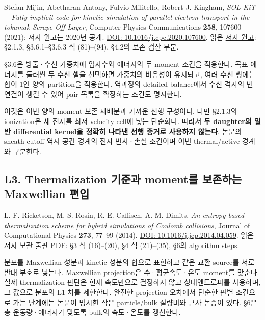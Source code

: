 Stefan Mijin, Abetharan Antony, Fulvio Militello, Robert J. Kingham, \emph{SOL-KiT---Fully implicit code for kinetic simulation of parallel electron transport in the tokamak Scrape-Off Layer}, Computer Physics Communications \textbf{258}, 107600 (2021); 저자 원고는 2020년 공개. \href{https://doi.org/10.1016/j.cpc.2020.107600}{DOI: 10.1016/j.cpc.2020.107600}. 읽은 \href{https://ar5iv.labs.arxiv.org/html/2003.00769}{저자 원고}: §2.1.3, §3.6.1--§3.6.3 식 (81)--(94), §4.2의 보존 검산 부분.

§3.6은 방출·수신 가중치에 입자수와 에너지의 두 moment 조건을 적용한다. 목표 에너지를 둘러싼 두 수신 셀을 선택하면 가중치의 비음성이 유지되고, 여러 수신 쌍에는 합이 1인 양의 partition을 적용한다. 역과정의 detailed balance에서 수신 격자의 빈 연결이 생길 수 있어 pair 목록을 확장하는 조건도 명시한다.

이것은 이번 양의 moment 보존 재배분과 가까운 선행 구성이다. 다만 §2.1.3의 ionization은 새 전자를 최저 velocity cell에 넣는 단순화다. 따라서 \textbf{두 daughter의 일반 differential kernel을 정확히 나타낸 선행 증거로 사용하지 않는다}. 논문의 sheath cutoff 역시 공간 경계의 전자 반사·손실 조건이며 이번 thermal/active 경계와 구분한다.

\hypertarget{l3.-thermalization-uxae30uxc900uxacfc-momentuxb97c-uxbcf4uxc874uxd558uxb294-maxwellian-uxd3b8uxc785}{%
\subsection{L3. Thermalization 기준과 moment를 보존하는 Maxwellian 편입}\label{l3.-thermalization-uxae30uxc900uxacfc-momentuxb97c-uxbcf4uxc874uxd558uxb294-maxwellian-uxd3b8uxc785}}

L. F. Ricketson, M. S. Rosin, R. E. Caflisch, A. M. Dimits, \emph{An entropy based thermalization scheme for hybrid simulations of Coulomb collisions}, Journal of Computational Physics \textbf{273}, 77--99 (2014). \href{https://doi.org/10.1016/j.jcp.2014.04.059}{DOI: 10.1016/j.jcp.2014.04.059}. 읽은 \href{https://www.math.ucla.edu/~caflisch/Pubs/Pubs2013-2014/RicketsonEntropyHybridJCP2014.pdf}{저자 보관 출판 PDF}: §3 식 (16)--(20), §4 식 (21)--(35), §6의 algorithm steps.

분포를 Maxwellian 성분과 kinetic 성분의 합으로 표현하고 같은 교환 source를 서로 반대 부호로 넣는다. Maxwellian projection은 수·평균속도·온도 moment를 맞춘다. 실제 thermalization 판단은 현재 속도만으로 결정하지 않고 상대엔트로피를 사용하며, 그 값으로 분포의 L1 차를 제한한다. 완전한 projection 오차에서 단순한 판별 조건으로 가는 단계에는 논문이 명시한 작은 particle/bulk 질량비와 근사 논증이 있다. §6은 총 운동량·에너지가 맞도록 bulk의 속도·온도를 갱신한다.

